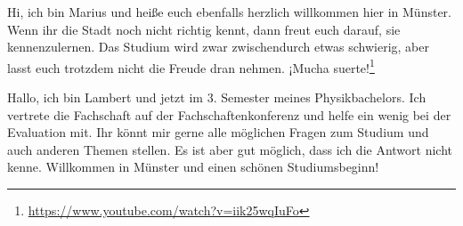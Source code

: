 \begin{multicols}{2}

{
Hi, ich bin Marius und heiße euch ebenfalls herzlich willkommen hier in Münster. Wenn ihr die Stadt noch nicht richtig kennt, dann freut euch darauf, sie kennenzulernen. 
Das Studium wird zwar zwischendurch etwas schwierig, aber lasst euch trotzdem nicht die Freude dran nehmen. ¡Mucha suerte!\footnote{\url{https://www.youtube.com/watch?v=iik25wqIuFo}}
}

{
Hallo, ich bin Lambert und jetzt im 3. Semester meines Physikbachelors. Ich vertrete die Fachschaft auf der Fachschaftenkonferenz und helfe ein wenig bei der Evaluation mit. 
Ihr könnt mir gerne alle möglichen Fragen zum Studium und auch anderen Themen stellen. Es ist aber gut möglich, dass ich die Antwort nicht kenne. 
Willkommen in Münster und einen schönen Studiumsbeginn!
}


\end{multicols}
